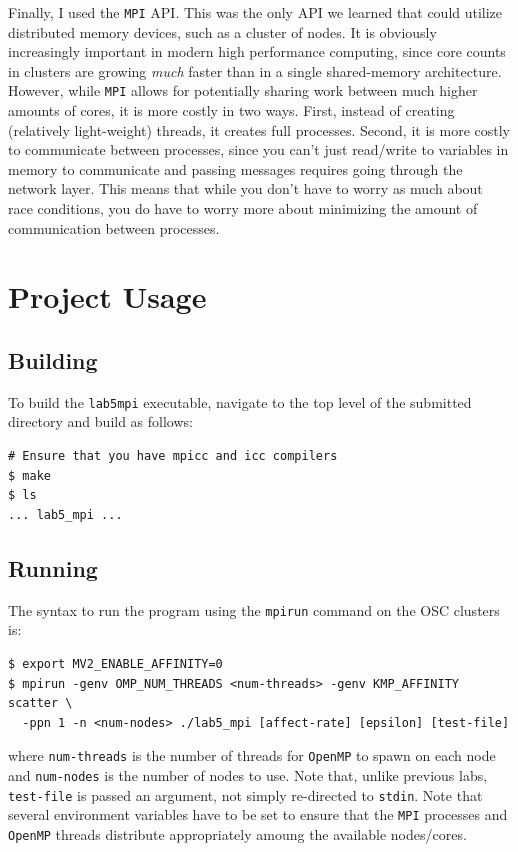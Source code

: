 \documentclass{article}
\begin{document}
Finally, I used the \texttt{MPI} API. This was the only API we learned that could utilize distributed memory devices,
such as a cluster of nodes. It is obviously increasingly important in modern high performance computing, since
core counts in clusters are growing \emph{much} faster than in a single shared-memory architecture. However, while
\texttt{MPI} allows for potentially sharing work between much higher amounts of cores, it is more costly in two ways.
First, instead of creating (relatively light-weight) threads, it creates full processes.
Second, it is more costly to communicate between processes, since you can't just read/write to variables in memory to communicate
and passing messages requires going through the network layer. This means that while you don't have to worry as much
about race conditions, you do have to worry more about minimizing the amount of communication between processes.

\section*{Project Usage}
\label{sec:project}

\subsection*{Building}
\label{subsec:building}

To build the \texttt{lab5\textunderscore mpi} executable, navigate
to the top level of the submitted directory and build as follows:

\begin{lstlisting}[style=DOS]
# Ensure that you have mpicc and icc compilers
$ make
$ ls
... lab5_mpi ...
\end{lstlisting}

\subsection*{Running}
\label{subsec:running}

The syntax to run the program using the \texttt{mpirun} command on the OSC clusters is:

\begin{lstlisting}[style=DOS]
$ export MV2_ENABLE_AFFINITY=0
$ mpirun -genv OMP_NUM_THREADS <num-threads> -genv KMP_AFFINITY scatter \
  -ppn 1 -n <num-nodes> ./lab5_mpi [affect-rate] [epsilon] [test-file]
\end{lstlisting}
where \texttt{num-threads} is the number of threads for \texttt{OpenMP} to spawn on each node
and \texttt{num-nodes} is the number of nodes to use.
Note that, unlike previous labs, \texttt{test-file}
is passed an argument, not simply re-directed to \texttt{stdin}. Note that several
environment variables have to be set to ensure that the \texttt{MPI} processes and 
\texttt{OpenMP} threads distribute appropriately amoung the available nodes/cores.
\end{document}

